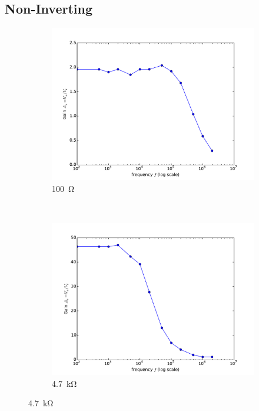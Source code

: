 \documentclass[12pt, a4paper]{article}
\begin{document}
\subsection{Non-Inverting}
\begin{figure}[H]
  \centering
  \begin{subfigure}[b]{0.45\textwidth}
    \includegraphics[width=1\textwidth]{img/q4.pdf}
    \caption{\SI{100}\ohm}
  \end{subfigure}
  ~
  \begin{subfigure}[b]{0.45\textwidth}
    \includegraphics[width=1\textwidth]{img/q3.pdf}
    \caption{\SI{4.7}\kohm}
  \end{subfigure}
\end{figure}
\end{document}
